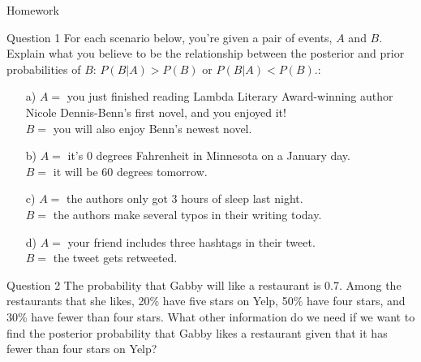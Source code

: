 \documentclass[12pt]{beamer}
\begin{document}
{
\begin{frame}{Homework}
\begin{itemize}
\color{aggiemaroon}{
\item Questions 1–5 next; questions 6-9 at the end of the topic.
\item Submit all answers by Fri Sep 11.
\item You may discuss with peers but submissions must be individual.
\item Responses may be shared anonymously during class discussion!
}
\end{itemize}
\end{frame}

\begin{frame}{}
\begin{block}{Question 1}
\small
For each scenario below, you’re given a pair of events, $A$ and $B$.
Explain what you believe to be the relationship between the posterior and prior probabilities of $B$: $P(B | A) > P(B)$ or $P(B | A) < P(B)$.:
\begin{enumerate}
\item[a)] $A =$ you just finished reading Lambda Literary Award-winning author Nicole Dennis-Benn’s first novel, and you enjoyed it!\\
$B =$ you will also enjoy Benn’s newest novel.
\item[b)] $A =$ it’s 0 degrees Fahrenheit in Minnesota on a January day.\\
$B =$ it will be 60 degrees tomorrow.
\item[c)] $A =$ the authors only got 3 hours of sleep last night.\\
$B =$ the authors make several typos in their writing today.
\item[d)] $A =$ your friend includes three hashtags in their tweet.\\
$B =$ the tweet gets retweeted.
\end{enumerate}
\end{block}
\end{frame}

\begin{frame}{}
\begin{block}{Question 2}
The probability that Gabby will like a restaurant is 0.7.
Among the restaurants that she likes, 20\% have five stars on Yelp, 50\% have four stars, and 30\% have fewer than four stars.
What other information do we need if we want to find the posterior probability that Gabby likes a restaurant given that it has fewer than four stars on Yelp?
\end{block}
\end{frame}

}
\end{document}
